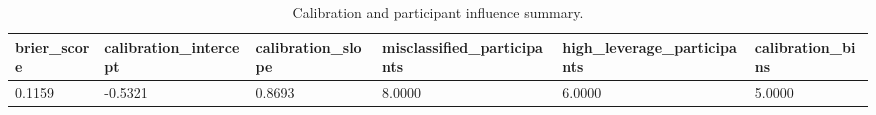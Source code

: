 \begin{table}[t]
\centering
\small
\caption{Calibration and participant influence summary.}
\label{tab:calibration-influence}
\begin{tabular}{llllll}
\toprule
brier\_score & calibration\_intercept & calibration\_slope & misclassified\_participants & high\_leverage\_participants & calibration\_bins \\
\midrule
0.1159 & -0.5321 & 0.8693 & 8.0000 & 6.0000 & 5.0000 \\
\bottomrule
\end{tabular}
\end{table}
